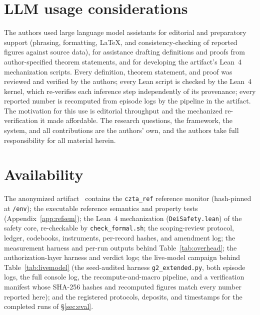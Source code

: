 \section*{LLM usage considerations}
The authors used large language model assistants for editorial and
preparatory support (phrasing, formatting, \LaTeX, and
consistency-checking of reported figures against source data), for
assistance drafting definitions and proofs from author-specified
theorem statements, and for developing the artifact's Lean~4
mechanization scripts. Every definition, theorem statement, and proof
was reviewed and verified by the authors; every Lean script is checked
by the Lean~4 kernel, which re-verifies each inference step
independently of its provenance; every reported number is recomputed
from episode logs by the pipeline in the artifact. The motivation for
this use is editorial throughput and the mechanized re-verification it
made affordable. The research questions, the framework, the system,
and all contributions are the authors' own, and the authors take full
responsibility for all material herein.

\section*{Availability}
The anonymized artifact~\cite{artifact} contains the \texttt{czta\_ref}
reference monitor (hash-pinned at \texttt{/env}); the executable
reference semantics and property tests (Appendix~\ref{app:refsem}); the
Lean~4 mechanization (\texttt{DeiSafety.lean}) of the safety core,
re-checkable by \texttt{check\_formal.sh}; the scoping-review protocol,
ledger, codebooks, instruments, per-record hashes, and amendment log;
the measurement harness and per-run outputs behind
Table~\ref{tab:overhead}; the authorization-layer harness and verdict
logs; the live-model campaign behind Table~\ref{tab:livemodel} (the
seed-audited harness \texttt{g2\_extended.py}, both episode logs, the
full console log, the recompute-and-macro pipeline, and a verification
manifest whose SHA-256 hashes and recomputed figures match every number
reported here); and the registered protocols, deposits, and timestamps
for the completed runs of \S\ref{sec:eval}.
